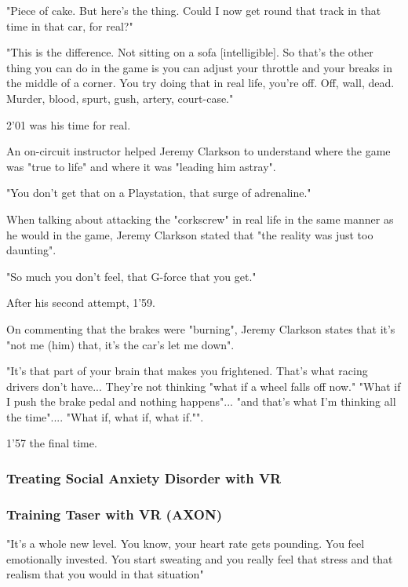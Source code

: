 \documentclass{article}
\begin{document}
"Piece of cake. But here's the thing. Could I now get round that track in that time in that car, for real?"

"This is the difference. Not sitting on a sofa [intelligible]. So that's the other thing you can do in the game is you can adjust your throttle and your breaks in the middle of a corner. You try doing that in real life, you're off. Off, wall, dead. Murder, blood, spurt, gush, artery, court-case."

2'01 was his time for real. 

An on-circuit instructor helped Jeremy Clarkson to understand where the game was "true to life" and where it was "leading him astray".

"You don't get that on a Playstation, that surge of adrenaline." 

When talking about attacking the "corkscrew" in real life in the same manner as he would in the game, Jeremy Clarkson stated that "the reality was just too daunting". 

"So much you don't feel, that G-force that you get."

After his second attempt, 1'59. 

On commenting that the brakes were "burning", Jeremy Clarkson states that it's "not me (him) that, it's the car's let me down". 

"It's that part of your brain that makes you frightened. That's what racing drivers don't have... They're not thinking "what if a wheel falls off now." "What if I push the brake pedal and nothing happens"... "and that's what I'm thinking all the time".... "What if, what if, what if."".

1'57 the final time.

\subsubsection{Treating Social Anxiety Disorder with VR}

\subsubsection{Training Taser with VR (AXON)}


"It's a whole new level. You know, your heart rate gets pounding. You feel emotionally invested. You start sweating and you really feel that stress and that realism that you would in that situation"
\end{document}
